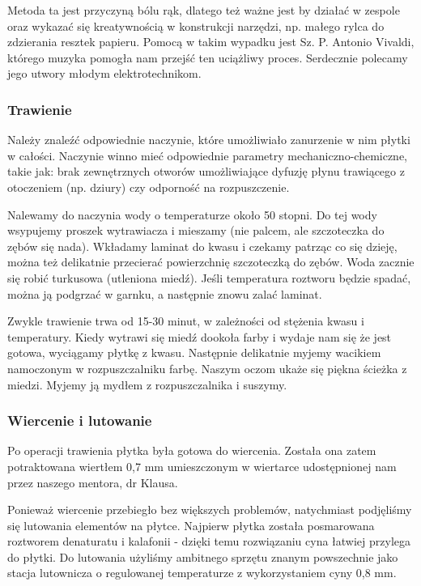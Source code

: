 Metoda ta jest przyczyną bólu rąk, dlatego też ważne jest by działać w zespole oraz wykazać się kreatywnością w konstrukcji narzędzi, np. małego rylca do zdzierania resztek papieru. Pomocą w takim wypadku jest Sz. P. Antonio Vivaldi, którego muzyka pomogła nam przejść ten uciążliwy proces. Serdecznie polecamy jego utwory młodym elektrotechnikom.

\subsubsection{Trawienie}

Należy znaleźć odpowiednie naczynie, które umożliwiało zanurzenie w nim płytki w całości. Naczynie winno mieć odpowiednie parametry mechaniczno-chemiczne, takie jak: brak zewnętrznych otworów umożliwiające dyfuzję płynu trawiącego z otoczeniem (np. dziury) czy odporność na rozpuszczenie.

Nalewamy do naczynia wody o temperaturze około 50 stopni. Do tej wody wsypujemy proszek wytrawiacza i mieszamy (nie palcem, ale szczoteczka do zębów się nada). Wkładamy laminat do kwasu i czekamy patrząc co się dzieję, można też delikatnie przecierać powierzchnię szczoteczką do zębów. Woda zacznie się robić turkusowa (utleniona miedź). Jeśli temperatura roztworu będzie spadać, można ją podgrzać w garnku, a następnie znowu zalać laminat. 

Zwykle trawienie trwa od 15-30 minut, w zależności od stężenia kwasu i temperatury. Kiedy wytrawi się miedź dookoła farby i wydaje nam się że jest gotowa, wyciągamy płytkę z kwasu. Następnie delikatnie myjemy wacikiem namoczonym w rozpuszczalniku farbę. Naszym oczom ukaże się piękna ścieżka z miedzi. Myjemy ją mydłem z rozpuszczalnika i suszymy.

\subsubsection{Wiercenie i lutowanie}

Po operacji trawienia płytka była gotowa do wiercenia. Została ona zatem potraktowana wiertłem 0,7 mm umieszczonym w wiertarce udostępnionej nam przez naszego mentora, dr Klausa. 

Ponieważ wiercenie przebiegło bez większych problemów, natychmiast podjęliśmy się lutowania elementów na płytce. Najpierw płytka została posmarowana roztworem denaturatu i kalafonii - dzięki temu rozwiązaniu cyna łatwiej przylega do płytki. Do lutowania użyliśmy ambitnego sprzętu znanym powszechnie jako stacja lutownicza o regulowanej temperaturze z wykorzystaniem cyny 0,8 mm.

